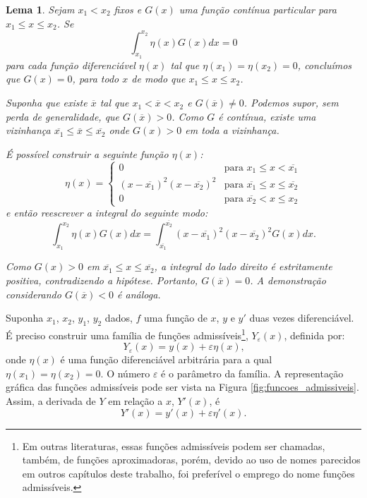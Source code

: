 \documentclass[
	12pt,				%
	openright,			%
    twoside,			%
	a4paper,			%
	chapter=TITLE,		%
	english,			%
	french,				%
	spanish,			%
	brazil				%
	]{abntex2}
\makeatletter
\newtheorem{lema}{Lema}
\renewenvironment{proof}[1][\proofname]{
	\par\pushQED{\qed}%
	\normalfont \topsep6\p@\@plus6\p@\relax
	\trivlist
	\item\relax
		{\itshape
			#1\@addpunct{.}}\hspace\labelsep\ignorespaces
}{%
	\popQED\endtrivlist\@endpefalse
}
\numberwithin{lema}{chapter}
\numberwithin{teorema}{chapter}
\numberwithin{definicao}{chapter}
\numberwithin{exemplo}{chapter}
\numberwithin{figure}{chapter}
\makeatother
\begin{document}
\begin{lema}
\label{lema:cap_calcvar_lema_1}
Sejam $x_1 < x_2$ fixos e $G(x)$ uma função contínua particular para $x_1 \leqslant x \leqslant x_2$. Se $$\int_{x_1}^{x_2} \eta (x) G(x) dx = 0$$
para cada função diferenciável $\eta (x)$ tal que $\eta (x_1)=\eta (x_2)=0$, concluímos que $G(x)=0$, para todo $x$ de modo que $x_1 \leqslant x \leqslant x_2$.

\begin{proof}
Suponha que existe $\overline{x}$ tal que $x_1<\overline{x}<x_2$ e $G(\overline{x})\neq 0$. Podemos supor, sem perda de generalidade, que $G(\overline{x})>0$. Como $G$ é contínua, existe uma vizinhança $\overline{x_1} \leqslant \overline{x} \leqslant \overline{x_2}$ onde $G(x)>0$ em toda a vizinhança.

É possível construir a seguinte função $\eta (x)$:
$$
\eta (x) = 
	\begin{cases}
		0 											& \mbox{para } x_1 \leqslant x < \overline{x_1}\\
		(x-\overline{x_1})^2(x-\overline{x_2})^2	& \mbox{para } \overline{x_1} \leqslant x \leqslant \overline{x_2}\\
		0											& \mbox{para } \overline{x_2} < x \leqslant x_2
	\end{cases}
$$
e então reescrever a integral do seguinte modo:
$$\int_{x_1}^{x_2}\eta (x) G(x)dx =\int_{\overline{x_1}}^{\overline{x_2}}(x-\overline{x_1})^2(x-\overline{x_2})^2G(x)dx\text{.}$$

Como $G(x) > 0$ em $\overline{x_1} \leqslant x \leqslant \overline{x_2}$, a integral do lado direito é estritamente positiva, contradizendo a hipótese. Portanto, $G(\overline{x})=0$. A demonstração considerando $G(\overline{x})<0$ é análoga.
\end{proof}
\end{lema}

Suponha $x_1$, $x_2$, $y_1$, $y_2$ dados, $f$ uma função de $x$, $y$ e $y'$ duas vezes diferenciável. É preciso construir uma família de funções admissíveis\footnote{Em outras literaturas, essas funções admissíveis podem ser chamadas, também, de funções aproximadoras, porém, devido ao uso de nomes parecidos em outros capítulos deste trabalho, foi preferível o emprego do nome funções admissíveis.}, $Y_{\varepsilon}(x)$, definida por:
\begin{equation}\label{eqn:cap_calc_var:func_admissible}
	Y_{\varepsilon}(x)=y(x)+\varepsilon \eta (x)\text{,}
\end{equation}
onde $\eta (x)$ é uma função diferenciável arbitrária para a qual $\eta (x_1)=\eta (x_2) = 0$. O número $\varepsilon$ é o parâmetro da família. A representação gráfica das funções admissíveis pode ser vista na Figura \ref{fig:funcoes_admissiveis}. Assim, a derivada de $Y$ em relação a $x$, $Y'(x)$, é
\begin{equation}\label{eqn:cap_calc_var:func_admissible_diff}
	Y'(x)=y'(x)+\varepsilon \eta '(x)\text{.}
\end{equation}
\end{document}
